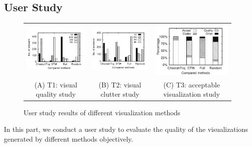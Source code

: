 \subsection{User Study}\label{sec:user}


\begin{figure}
     \centering
     \begin{tabular}{ccc}
		\includegraphics[width=0.22\linewidth]{pictures/user_study/quality}
		&
		\includegraphics[width=0.22\linewidth]{pictures/user_study/clutter}
        &
        \includegraphics[width=0.22\linewidth]{pictures/user_study/accept}
		\\
		(A) T1: visual quality study
		&
		(B) T2: visual clutter study
        &
        (C) T3: acceptable visualization study
	\end{tabular}
	\vspace{-4mm}
	\caption{User study results of different visualization methods}
	\label{fig:userstudy}
    \trim
\end{figure}
\fi

In this part, we conduct a user study to evaluate the quality of the visualizations generated by different methods objectively.



